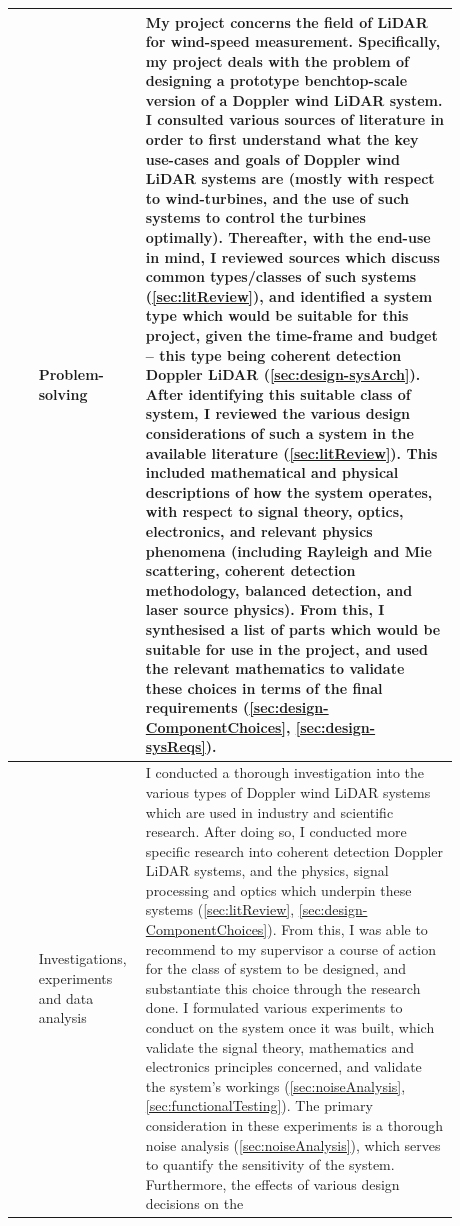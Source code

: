 \begin{longtable}{|>{\centering\arraybackslash}p{0.05\linewidth}
		|>{\raggedright\arraybackslash}p{0.17\linewidth}
		|p{0.66\linewidth}||}
	1 & Problem-solving & My project concerns the field of LiDAR for wind-speed measurement. Specifically, my project deals
	with the problem of designing a prototype benchtop-scale version of a Doppler wind LiDAR system. I
	consulted various sources of literature in order to first understand what the key use-cases and goals of
	Doppler wind LiDAR systems are (mostly with respect to wind-turbines, and the use of such systems to
	control the turbines optimally). Thereafter, with the end-use in mind, I reviewed sources which discuss
	common types/classes of such systems (\autoref{sec:litReview}), and identified a system type which would be suitable for this
	project, given the time-frame and budget -- this type being coherent detection Doppler LiDAR (\autoref{sec:design-sysArch}).
	After identifying this suitable class of system, I reviewed the various design considerations of such a
	system in the available literature (\autoref{sec:litReview}). This included mathematical and physical descriptions of how the
	system operates, with respect to signal theory, optics, electronics, and relevant physics phenomena
	(including Rayleigh and Mie scattering, coherent detection methodology, balanced detection, and
	laser source physics). From this, I synthesised a list of parts which would be suitable for use in the project, and used the relevant mathematics to validate these choices in terms of the final
	requirements (\autoref{sec:design-ComponentChoices}, \autoref{sec:design-sysReqs}).
	\\
	\hline
	4 & Investigations, experiments and data analysis & I conducted a thorough investigation into the various types of Doppler wind LiDAR systems which are
	used in industry and scientific research. After doing so, I conducted more specific research into
	coherent detection Doppler LiDAR systems, and the physics, signal processing and optics which
	underpin these systems (\autoref{sec:litReview}, \autoref{sec:design-ComponentChoices}). From this, I was able to recommend to my supervisor a course of action for
	the class of system to be designed, and substantiate this choice through the research done.
	I formulated various experiments to conduct on the system once it
	was built, which validate the signal theory, mathematics and electronics principles
	concerned, and validate the system's workings (\autoref{sec:noiseAnalysis}, \autoref{sec:functionalTesting}). The primary consideration in these experiments is a thorough noise analysis (\autoref{sec:noiseAnalysis}), which
	serves to quantify the sensitivity of the system. Furthermore, the effects of various design decisions on the

\end{longtable}
